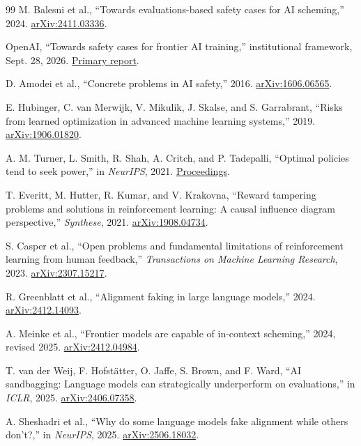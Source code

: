 \documentclass[10pt,twocolumn,letterpaper]{article}
\begin{document}
\begin{thebibliography}{99}
 M. Balesni et al., ``Towards evaluations-based safety cases for AI scheming,'' 2024. \href{https://arxiv.org/abs/2411.03336}{arXiv:2411.03336}.

 OpenAI, ``Towards safety cases for frontier AI training,'' institutional framework, Sept. 28, 2026. \href{https://openai.com/index/towards-safety-cases-for-frontier-ai-training/}{Primary report}.

 D. Amodei et al., ``Concrete problems in AI safety,'' 2016. \href{https://arxiv.org/abs/1606.06565}{arXiv:1606.06565}.

 E. Hubinger, C. van Merwijk, V. Mikulik, J. Skalse, and S. Garrabrant, ``Risks from learned optimization in advanced machine learning systems,'' 2019. \href{https://arxiv.org/abs/1906.01820}{arXiv:1906.01820}.

 A. M. Turner, L. Smith, R. Shah, A. Critch, and P. Tadepalli, ``Optimal policies tend to seek power,'' in \emph{NeurIPS}, 2021. \href{https://proceedings.neurips.cc/paper/2021/hash/c26820b8a4c1b3c2aa868d6d57e14a79-Abstract.html}{Proceedings}.

 T. Everitt, M. Hutter, R. Kumar, and V. Krakovna, ``Reward tampering problems and solutions in reinforcement learning: A causal influence diagram perspective,'' \emph{Synthese}, 2021. \href{https://arxiv.org/abs/1908.04734}{arXiv:1908.04734}.

 S. Casper et al., ``Open problems and fundamental limitations of reinforcement learning from human feedback,'' \emph{Transactions on Machine Learning Research}, 2023. \href{https://arxiv.org/abs/2307.15217}{arXiv:2307.15217}.

 R. Greenblatt et al., ``Alignment faking in large language models,'' 2024. \href{https://arxiv.org/abs/2412.14093}{arXiv:2412.14093}.

 A. Meinke et al., ``Frontier models are capable of in-context scheming,'' 2024, revised 2025. \href{https://arxiv.org/abs/2412.04984}{arXiv:2412.04984}.

 T. van der Weij, F. Hofst\"atter, O. Jaffe, S. Brown, and F. Ward, ``AI sandbagging: Language models can strategically underperform on evaluations,'' in \emph{ICLR}, 2025. \href{https://arxiv.org/abs/2406.07358}{arXiv:2406.07358}.

 A. Sheshadri et al., ``Why do some language models fake alignment while others don't?,'' in \emph{NeurIPS}, 2025. \href{https://arxiv.org/abs/2506.18032}{arXiv:2506.18032}.


\end{thebibliography}
\end{document}
